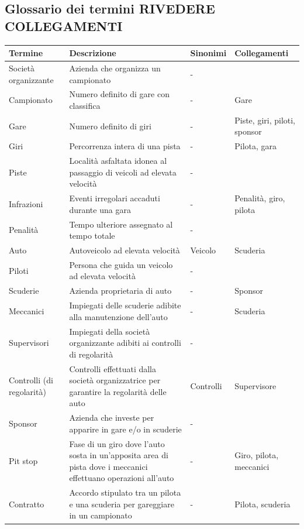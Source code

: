 \documentclass[11pt]{article}
\begin{document}
\subsection{Glossario dei termini \textbf{RIVEDERE COLLEGAMENTI}}
\begin{tabularx}{\linewidth}{
        |>{\hsize=0.9\hsize}X|%
        >{\hsize=1.8\hsize}X|%
        >{\hsize=0.6\hsize}X|%
        >{\hsize=0.7\hsize}X|%
    }
    \hline
    \textbf{Termine} & \textbf{Descrizione} & \textbf{Sinonimi} & \textbf{Collegamenti} \\
    \hline
    Società organizzante & Azienda che organizza un campionato & - & \\
    \hline
    Campionato & Numero definito di gare con classifica & - & Gare \\
    \hline
    Gare & Numero definito di giri & - & Piste, giri, piloti, sponsor \\
    \hline
    Giri & Percorrenza intera di una pista & - & Pilota, gara \\
    \hline
    Piste & Località asfaltata idonea al passaggio di veicoli ad elevata velocità & - & \\
    \hline
    Infrazioni & Eventi irregolari accaduti durante una gara & - & Penalità, giro, pilota \\
    \hline
    Penalità & Tempo ulteriore assegnato al tempo totale & - & \\
    \hline
    Auto & Autoveicolo ad elevata velocità & Veicolo & Scuderia \\
    \hline
    Piloti & Persona che guida un veicolo ad elevata velocità & - & \\
    \hline
    Scuderie & Azienda proprietaria di auto & - & Sponsor \\
    \hline
    Meccanici & Impiegati delle scuderie adibite alla manutenzione dell'auto & - & Scuderia \\
    \hline
    Supervisori & Impiegati della società organizzante adibiti ai controlli di regolarità & - & \\
    \hline
    Controlli (di regolarità) & Controlli effettuati dalla società organizzatrice per garantire la regolarità delle auto & Controlli & Supervisore \\
    \hline
    Sponsor & Azienda che investe per apparire in gare e/o in scuderie & - & \\
    \hline
    Pit stop & Fase di un giro dove l'auto sosta in un'apposita area di pista dove i meccanici effettuano operazioni all'auto & - & Giro, pilota, meccanici \\
    \hline
    Contratto & Accordo stipulato tra un pilota e una scuderia per gareggiare in un campionato & - & Pilota, scuderia \\
    \hline
\end{tabularx}    
\end{document}
